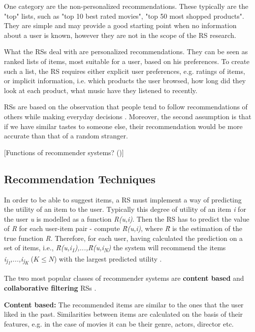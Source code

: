 \documentclass[12pt]{report}
\begin{document}
One category are the non-personalized recommendations. These typically are the "top" lists, such as "top 10 best rated movies", "top 50 most shopped products". They are simple and may provide a good starting point when no information about a user is known, however they are not in the scope of the RS research.

What the RSs deal with are personalized recommendations. They can be seen as ranked lists of items, most suitable for a user, based on his preferences. To create such a list, the RS requires either explicit user preferences, e.g. ratings of items, or implicit information, i.e. which products the user browsed, how long did they look at each product, what music have they listened to recently.

RSs are based on the observation that people tend to follow recommendations of others while making everyday decisions \cite{rec_sys_handbook}. Moreover, the second assumption is that if we have similar tastes to someone else, their recommendation would be more accurate than that of a random stranger.

[Functions of recommender systems? (\cite{rec_sys_handbook})]

\subsection{Recommendation Techniques}

In order to be able to suggest items, a RS must implement a way of predicting the utility of an item to the user. Typically this degree of utility of an item \textit{i} for the user \textit{u} is modelled as a function \textit{R(u,i)}. Then the RS has to predict the value of \textit{R} for each user-item pair - compute \textit{\^{R}(u,i)}, where \textit{\^{R}} is the estimation of the true function \textit{R}. Therefore, for each user, having calculated the prediction on a set of items, i.e., \textit{\^{R}(u,i\textsubscript{1}),...,\^{R}(u,i\textsubscript{N})} the system will recommend the items \textit{i\textsubscript{j\textsubscript{1}},...,i\textsubscript{j\textsubscript{K}}} ($K \leq N$) with the largest predicted utility \cite{rec_sys_handbook}.

The two most popular classes of recommender systems are {\bf content based} and {\bf collaborative filtering} RSs \cite{rec_sys_handbook}.

\hbox{}
{\bf Content based:} The recommended items are similar to the ones that the user liked in the past. Similarities between items are calculated on the basis of their features, e.g. in the case of movies it can be their genre, actors, director etc.
\end{document}
